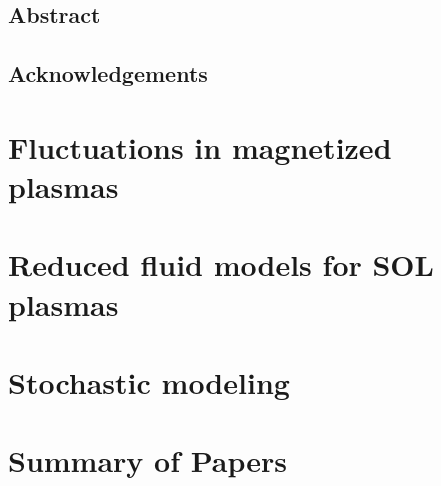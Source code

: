 \documentclass[11pt,twoside,openright]{book}
\begin{document}
\frontmatter


\newpage\null\thispagestyle{empty}\newpage

\setcounter{page}{1}\thispagestyle{empty}\newpage

\section*{Abstract}


\newpage\null\newpage
\section*{Acknowledgements}

\newpage\null\newpage

\tableofcontents

\mainmatter

\chapter{Fluctuations in magnetized plasmas}


\chapter{Reduced fluid models for SOL plasmas}


\chapter{Stochastic modeling}


\chapter{Summary of Papers}\label{ch:sum-paper}


\end{document}
